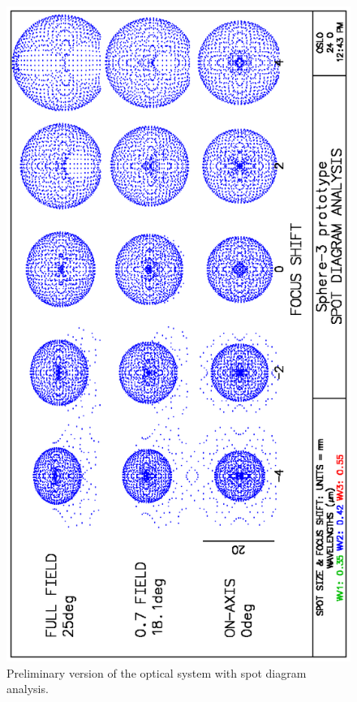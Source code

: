 \documentclass[a4paper]{jpconf}
\begin{document}
\begin{figure}
\begin{minipage}[b]{.52\textwidth}
        \includegraphics[height=.365\textheight, angle=-90]{Sphere3spot.eps}
        \caption{Preliminary version of the optical system with spot diagram analysis.}
        \label{fig:lightspots}
    \end{minipage}
\end{figure}
\end{document}
